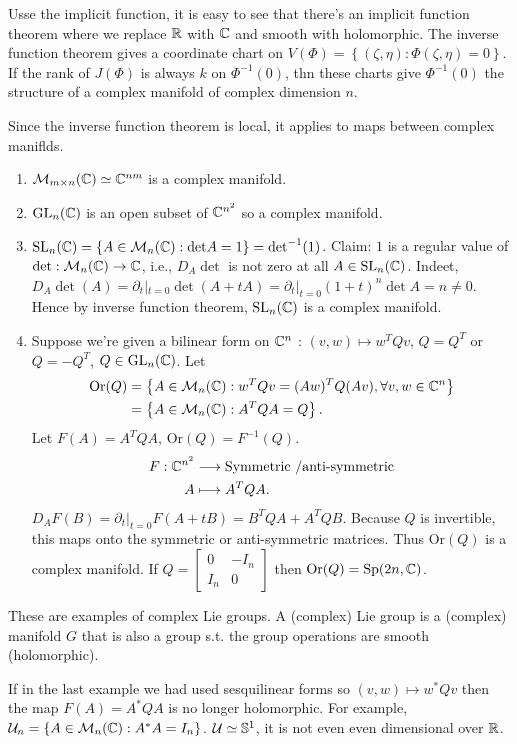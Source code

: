 Usse the implicit function, it is easy to see that there's an implicit function theorem where we replace $\mathbb{R}$ with $\mathbb{C}$ and smooth with holomorphic.
The inverse function theorem gives a coordinate chart on $V(\Phi)=\left\{(\zeta,\eta):\Phi(\zeta,\eta)=0\right\} $. If the rank of $J(\Phi)$ is always $k$ on $\Phi^{-1}(0)$, thn these charts give $\Phi^{-1}(0)$ the structure of a complex manifold of complex dimension $n$.

Since the inverse function theorem is local, it applies to maps between complex maniflds.

\begin{example}
  \begin{enumerate}
    \item $\mathcal{M}_{m\times n}(\mathbb{C})\simeq \mathbb{C}^{nm}$ is a complex manifold.
    \item $\mathrm{GL}_n(\mathbb{C})$ is an open subset of $\mathbb{C}^{n^2}$ so a complex manifold.
    \item $\operatorname{SL}_n(\mathbb{C})=\left\{A \in \mathcal{M}_n(\mathbb{C}):\mathrm{det}A=1\right\}=\mathrm{det}^{-1}(1) $.
      Claim: $1$ is a regular value of $\operatorname{det}:\mathcal{M}_n(\mathbb{C})\to \mathbb{C}$, i.e., $D_A \det $ is not zero at all $A \in \operatorname{SL}_n(\mathbb{C})$. Indeet, $D_A \det(A)=\partial_t|_{t=0}\det(A+tA)=\partial_t|_{t=0}(1+t)^{n}\det A=n\neq 0$. Hence by inverse function theorem, $\operatorname{SL}_n(\mathbb{C})$ is a complex manifold.
    \item Suppose we're given a bilinear form on $\mathbb{C}^{n}$ : $(v,w)\mapsto w^{T}Qv$, $Q=Q^{T}$ or $Q=-Q^{T}$, $Q\in \operatorname{GL}_n(\mathbb{C})$. Let 
      \begin{align*}
	\mathrm{Or}(Q)&=\left\{A\in \mathcal{M}_n(\mathbb{C}):w^{T}Qv =(Aw)^{T}Q(Av),\forall v,w \in \mathbb{C}^{n}\right\}\\
	&=\left\{A\in \mathcal{M}_n(\mathbb{C}):A^{T}QA=Q\right\}. 
      \end{align*}
      Let $F(A)=A^{T}QA$, $\mathrm{Or}(Q)=F^{-1}(Q)$.
      \begin{align*}
        F: \mathbb{C}^{n^2} &\longrightarrow \text{Symmetric /anti-symmetric} \\
        A &\longmapsto A^{T}QA
      .\end{align*}
	$D_A F(B)=\partial_t|_{t=0}F(A+tB)=B^{T}QA+A^{T}QB$. Because $Q$ is invertible, this maps onto the symmetric or anti-symmetric matrices. Thus $\mathrm{Or}(Q)$ is a complex manifold. If $Q=\begin{bmatrix} 0 & -I_n\\ I_n & 0 \end{bmatrix} $ then $\mathrm{Or}(Q)=\text{Sp}(2n,\mathbb{C})$. 
  \end{enumerate} 
  These are examples of complex Lie groups. A (complex) Lie group is a (complex) manifold $G$ that is also   a group s.t. the group operations are smooth (holomorphic).

  If in the last example we had used sesquilinear forms so $(v,w)\mapsto w^*Qv$ then the map $F(A)=A^*QA$ is no longer holomorphic. For example, $\mathcal{U}_n=\left\{A\in \mathcal{M}_n(\mathbb{C}):A^*A=I_n\right\} $. $\mathcal{U}\simeq \mathbb{S}^{1}$, it is not even even dimensional over $\mathbb{R}$.
\end{example}


